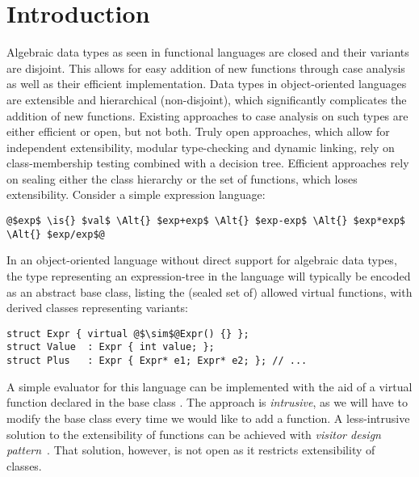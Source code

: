 \section{Introduction} %
\label{sec:intro}


Algebraic data types as seen in functional languages are closed and their 
variants are disjoint. This allows for easy addition of new functions through 
case analysis as well as their efficient implementation. Data types in 
object-oriented languages are extensible and hierarchical (non-disjoint), which 
significantly complicates the addition of new functions. Existing approaches to 
case analysis on such types are either efficient or open, but not both. Truly 
open approaches, which allow for independent extensibility, modular 
type-checking and dynamic linking, rely on class-membership testing combined 
with a decision tree. Efficient approaches rely on sealing either the class 
hierarchy or the set of functions, which loses extensibility. Consider a simple 
expression language:

\begin{lstlisting}
@$exp$ \is{} $val$ \Alt{} $exp+exp$ \Alt{} $exp-exp$ \Alt{} $exp*exp$ \Alt{} $exp/exp$@
\end{lstlisting}

\noindent 
In an object-oriented language without direct support for algebraic data types, 
the type representing an expression-tree in the language will typically be 
encoded as an abstract base class, listing the (sealed set of) allowed virtual 
functions, with derived classes representing variants:

\begin{lstlisting}[keepspaces,columns=flexible]
struct Expr { virtual @$\sim$@Expr() {} };
struct Value  : Expr { int value; };
struct Plus   : Expr { Expr* e1; Expr* e2; }; // ...
\end{lstlisting}

\noindent
A simple evaluator for this language can be implemented with the aid of a
virtual function  declared in the base class . 
The approach is \emph{intrusive}, as we will have to modify the base class every 
time we would like to add a function. A less-intrusive solution to the 
extensibility of functions can be achieved with \emph{visitor design 
pattern}~\cite{DesignPatterns1993}. That solution, however, is not open as it 
restricts extensibility of classes.

